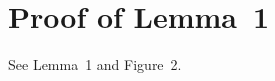 \documentclass{article}
\begin{document}
\tableofcontents
\section{Proof of Lemma~1}
See Lemma~1 and \textsf{Figure~2}.
\end{document}
